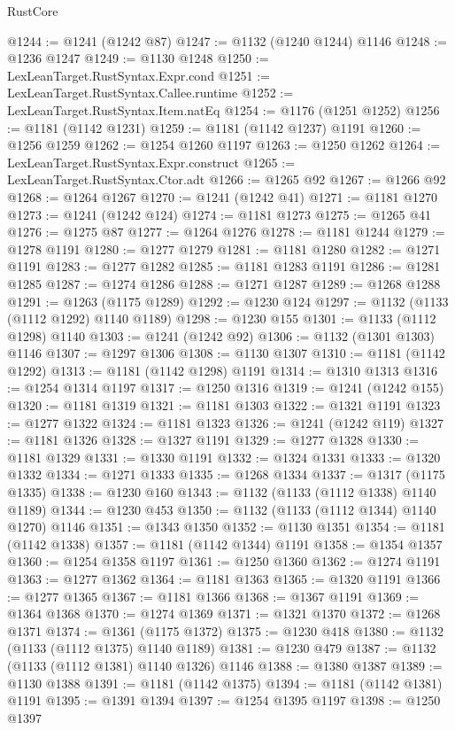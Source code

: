 \begin{lexlean}{RustCore}
\begin{coremodule}
@1244 := @1241 (@1242 @87)
@1247 := @1132 (@1240 @1244) @1146
@1248 := @1236 @1247
@1249 := @1130 @1248
@1250 := LexLeanTarget.RustSyntax.Expr.cond
@1251 := LexLeanTarget.RustSyntax.Callee.runtime
@1252 := LexLeanTarget.RustSyntax.Item.natEq
@1254 := @1176 (@1251 @1252)
@1256 := @1181 (@1142 @1231)
@1259 := @1181 (@1142 @1237) @1191
@1260 := @1256 @1259
@1262 := @1254 @1260 @1197
@1263 := @1250 @1262
@1264 := LexLeanTarget.RustSyntax.Expr.construct
@1265 := LexLeanTarget.RustSyntax.Ctor.adt
@1266 := @1265 @92
@1267 := @1266 @92
@1268 := @1264 @1267
@1270 := @1241 (@1242 @41)
@1271 := @1181 @1270
@1273 := @1241 (@1242 @124)
@1274 := @1181 @1273
@1275 := @1265 @41
@1276 := @1275 @87
@1277 := @1264 @1276
@1278 := @1181 @1244
@1279 := @1278 @1191
@1280 := @1277 @1279
@1281 := @1181 @1280
@1282 := @1271 @1191
@1283 := @1277 @1282
@1285 := @1181 @1283 @1191
@1286 := @1281 @1285
@1287 := @1274 @1286
@1288 := @1271 @1287
@1289 := @1268 @1288
@1291 := @1263 (@1175 @1289)
@1292 := @1230 @124
@1297 := @1132 (@1133 (@1112 @1292) @1140 @1189)
@1298 := @1230 @155
@1301 := @1133 (@1112 @1298) @1140
@1303 := @1241 (@1242 @92)
@1306 := @1132 (@1301 @1303) @1146
@1307 := @1297 @1306
@1308 := @1130 @1307
@1310 := @1181 (@1142 @1292)
@1313 := @1181 (@1142 @1298) @1191
@1314 := @1310 @1313
@1316 := @1254 @1314 @1197
@1317 := @1250 @1316
@1319 := @1241 (@1242 @155)
@1320 := @1181 @1319
@1321 := @1181 @1303
@1322 := @1321 @1191
@1323 := @1277 @1322
@1324 := @1181 @1323
@1326 := @1241 (@1242 @119)
@1327 := @1181 @1326
@1328 := @1327 @1191
@1329 := @1277 @1328
@1330 := @1181 @1329
@1331 := @1330 @1191
@1332 := @1324 @1331
@1333 := @1320 @1332
@1334 := @1271 @1333
@1335 := @1268 @1334
@1337 := @1317 (@1175 @1335)
@1338 := @1230 @160
@1343 := @1132 (@1133 (@1112 @1338) @1140 @1189)
@1344 := @1230 @453
@1350 := @1132 (@1133 (@1112 @1344) @1140 @1270) @1146
@1351 := @1343 @1350
@1352 := @1130 @1351
@1354 := @1181 (@1142 @1338)
@1357 := @1181 (@1142 @1344) @1191
@1358 := @1354 @1357
@1360 := @1254 @1358 @1197
@1361 := @1250 @1360
@1362 := @1274 @1191
@1363 := @1277 @1362
@1364 := @1181 @1363
@1365 := @1320 @1191
@1366 := @1277 @1365
@1367 := @1181 @1366
@1368 := @1367 @1191
@1369 := @1364 @1368
@1370 := @1274 @1369
@1371 := @1321 @1370
@1372 := @1268 @1371
@1374 := @1361 (@1175 @1372)
@1375 := @1230 @418
@1380 := @1132 (@1133 (@1112 @1375) @1140 @1189)
@1381 := @1230 @479
@1387 := @1132 (@1133 (@1112 @1381) @1140 @1326) @1146
@1388 := @1380 @1387
@1389 := @1130 @1388
@1391 := @1181 (@1142 @1375)
@1394 := @1181 (@1142 @1381) @1191
@1395 := @1391 @1394
@1397 := @1254 @1395 @1197
@1398 := @1250 @1397

\end{coremodule}
\end{lexlean}
